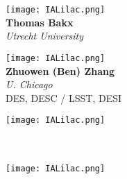 \documentclass[12pt,letterpaper]{article}
\begin{document}
\begin{multicols}{2}
    \begin{minipage}[t][2in][c]{.45\textwidth}
    \centering
    \texttt{[image: IALilac.png]}\\ \vspace{.5cm}
    \Huge \textbf{Thomas Bakx}\\
    \vspace{0.5cm}
    \Large \textit{Utrecht University} \\
    \vspace{0.5cm}
    \small 
    \end{minipage}
    \vspace{1cm}
    
    \begin{minipage}[t][2in][c]{.45\textwidth}
    \centering
    \texttt{[image: IALilac.png]}\\ \vspace{.5cm}
    \LARGE \textbf{Zhuowen (Ben) Zhang}\\
    \vspace{0.5cm}
    \Large \textit{U. Chicago} \\
    \vspace{0.5cm}
    \small DES, DESC / LSST, DESI
    \end{minipage}
    \vspace{1cm}

    \begin{minipage}[t][2in][c]{.45\textwidth}
    \centering
    \texttt{[image: IALilac.png]}\\ \vspace{.5cm}
    \huge \textbf{   }\\
    \vspace{0.5cm}
    \Large \textit{   } \\
    \vspace{0.5cm}
    \small  
    \end{minipage}
    \vspace{1cm}

    \begin{minipage}[t][2in][c]{.45\textwidth}
    \centering
    \texttt{[image: IALilac.png]}\\ \vspace{.5cm}
    \huge \textbf{   }\\
    \vspace{0.5cm}
    \Large \textit{   } \\
    \vspace{0.5cm}
    \small  
    \end{minipage}
    \vspace{1cm}


\end{multicols}
\end{document}
